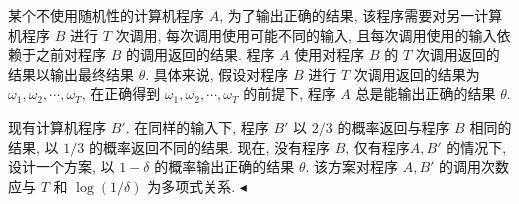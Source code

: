 \documentclass[11pt]{article}
\newenvironment{problem}[2][Problem]{\begin{trivlist}
    \item[\hskip \labelsep {\bfseries #1}\hskip \labelsep {\bfseries #2.}]\songti}{\hfill$\blacktriangleleft$\end{trivlist}}
\newcommand\1{\mathds{1}}
\begin{document}
\begin{problem}{3}
    某个不使用随机性的计算机程序 $A$, 为了输出正确的结果, 该程序需要对另一计算机程序 $B$ 进行 $T$ 次调用,
    每次调用使用可能不同的输入, 且每次调用使用的输入依赖于之前对程序 $B$ 的调用返回的结果. 
    程序 $A$ 使用对程序 $B$ 的 $T$ 次调用返回的结果以输出最终结果 $\theta$. 
    具体来说, 假设对程序 $B$ 进行 $T$ 次调用返回的结果为 $\omega_1, \omega_2,\cdots, \omega_T$, 在正确得到 $\omega_1, \omega_2,\cdots, \omega_T$ 的前提下, 
    程序 $A$ 总是能输出正确的结果 $\theta$.
    
    现有计算机程序 $B'$. 在同样的输入下, 程序 $B'$ 以 $2/3$ 的概率返回与程序 $B$ 相同的结果, 以 $1/3$ 的概率返回不同的结果.
    现在, 没有程序 $B$, 仅有程序$A, B'$ 的情况下, 设计一个方案, 以 $1-\delta$ 的概率输出正确的结果 $\theta$.
    该方案对程序 $A, B'$ 的调用次数应与 $T$ 和 $\log(1/\delta)$ 为多项式关系.
\end{problem}
\end{document}
